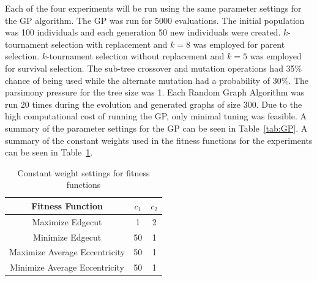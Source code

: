 \documentclass{article}
\begin{document}
Each of the four experiments will be run using the same parameter settings for the GP algorithm.  
The GP was run for 5000 evaluations. The initial population
was 100 individuals and each generation 50 new individuals were created. $k$-tournament selection with replacement 
and $k=8$ was employed for parent selection. $k$-tournament selection without replacement and $k=5$ was employed for survival selection.
The sub-tree crossover and mutation operations had 35\% chance of being used
while the alternate mutation had a probability of 30\%. The parsimony pressure for the tree size was 1.
Each Random Graph Algorithm was run 20 times during the evolution and generated graphs of size 300. 
Due to the high computational cost of running the GP, only minimal tuning was feasible. A summary
of the parameter settings for the GP can be seen in Table~\ref{tab:GP}. A summary of the constant weights used
in the fitness functions for the experiments can be seen in Table~\ref{tab:fitness}.


\begin{table}
    \begin{center}
    \begin{tabular}{|c|c|c|}
    \hline
    \textbf{Fitness Function} & \textbf{$c_1$} & \textbf{$c_2$} \\ \hline
    Maximize Edgecut&1 & 2\\ \hline
    Minimize Edgecut&50& 1 \\ \hline
    Maximize Average Eccentricity& 50 &1\\ \hline
    Minimize Average Eccentricity& 50 &1\\ \hline
    \end{tabular}
    \end{center}
    \caption{Constant weight settings for fitness functions}
    \label{tab:fitness}
\end{table}
\end{document}

